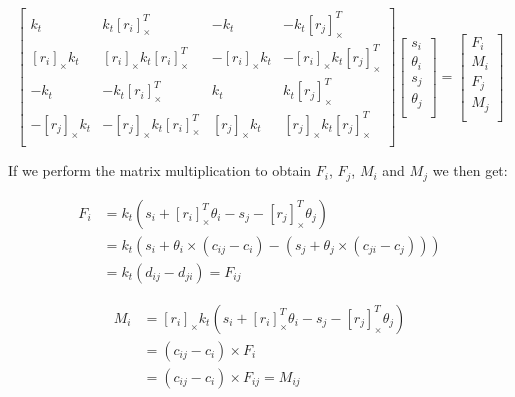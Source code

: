 \begin{equation}
    \begin{bmatrix}
        k_t & k_t[r_i]_\times^T & -k_t & -k_t[r_j]_\times^T \\
        [r_i]_\times k_t & [r_i]_\times k_t [r_i]_\times^T & -[r_i]_\times k_t & -[r_i]_\times k_t [r_j]_\times^T \\
        -k_t & -k_t[r_i]_\times^T & k_t & k_t[r_j]_\times^T \\
        -[r_j]_\times k_t & -[r_j]_\times k_t [r_i]_\times^T & [r_j]_\times k_t & [r_j]_\times k_t [r_j]_\times^T \\
        
    \end{bmatrix}
    \begin{bmatrix}
        s_i \\
        \theta_i \\
        s_j \\
        \theta_j\\
    \end{bmatrix}
    =
    \begin{bmatrix}
        F_i \\
        M_i \\
        F_j \\
        M_j\\
    \end{bmatrix}
\end{equation}

If we perform the matrix multiplication to obtain $F_i$, $F_j$, $M_i$ and $M_j$ 
we then get:

\begin{equation}
\begin{split}
    F_i & = k_t(s_i + [r_i]_\times^T \theta_i - s_j - [r_j]_\times^T \theta_j) \\
    & = k_t(s_i + \theta_i \times (c_{ij} - c_i) - (s_j + \theta_j \times (c_{ji} - c_j)))  \\
    & = k_t(d_{ij} - d_{ji}) = F_{ij}
\end{split}
\end{equation}

\begin{equation}
\begin{split}
    M_i & = [r_i]_\times k_t(s_i + [r_i]_\times^T \theta_i - s_j - [r_j]_\times^T \theta_j) \\
    & = (c_{ij} - c_i) \times F_i \\
    & = (c_{ij} - c_i) \times F_{ij} = M_{ij}
\end{split}
\end{equation}

